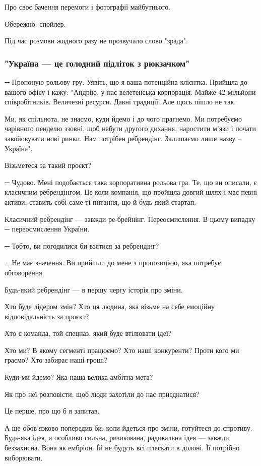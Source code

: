 Про своє бачення перемоги і фотографії майбутнього.

Обережно: спойлер. 

Під час розмови жодного разу не прозвучало слово "зрада". 

\subsubsection{"Україна --- це голодний підліток з рюкзачком"}

─ Пропоную рольову гру. Уявіть, що я ваша потенційна клієнтка. Прийшла до
вашого офісу і кажу: "Андрію, у нас велетенська корпорація. Майже 42 мільйони
співробітників. Величезні ресурси. Давні традиції. Але щось пішло не так.

Ми, як спільнота, не знаємо, куди йдемо і до чого прагнемо. Ми потребуємо
чарівного пенделю ззовні, щоб набути другого дихання, наростити м’язи і почати
завойовувати нові ринки. Нам потрібен ребрендінг. Залишаємо лише назву –
Україна".

Візьметеся за такий проєкт?

─ Чудово. Мені подобається така корпоративна рольова гра. Те, що ви описали, є
класичним ребрендінгом. Це коли компанія, що пройшла довгий шлях і має певні
активи, ставить собі саме ті питання, що й будь-який стартап.

Класичний ребрендінг --- завжди ре-брейнінг. Переосмислення. В цьому випадку ─
переосмислення України.

─ Тобто, ви погодилися би взятися за ребрендінг?

─ Не має значення. Ви прийшли до мене з пропозицією, яка потребує обговорення.

Будь-який ребрендінг --- в першу чергу історія про зміни.

Хто буде лідером змін? Хто ця людина, яка візьме на себе емоційну
відповідальність за проєкт?

Хто є команда, той спецназ, який буде втілювати ідеї?

Хто ми? В якому сегменті працюємо? Хто наші конкуренти? Проти кого ми граємо?
Хто забирає наші гроші?

Куди ми йдемо? Яка наша велика амбітна мета?

Як про неї розповісти, щоб люди захотіли до нас приєднатися?

Це перше, про що б я запитав.

А ще обов’язково попередив би: коли йдеться про зміни, готуйтеся до спротиву.
Будь-яка ідея, а особливо сильна, ризикована, радикальна ідея --- завжди
беззахисна. Вона як ембріон. Їй не будуть всі плескати в долоні. Її потрібно
виборювати.

